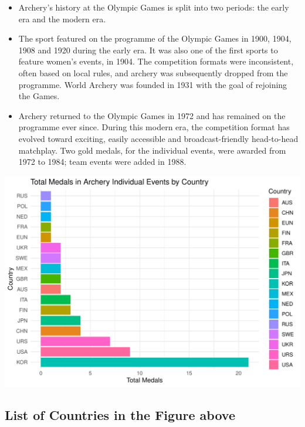 \documentclass[12pt,preprint, authoryear]{elsarticle}
\let\origfigure\figure
\let\endorigfigure\endfigure
\renewenvironment{figure}[1][2] {
    \expandafter\origfigure\expandafter[H]
} {
    \endorigfigure
}
\numberwithin{equation}{section}
\numberwithin{figure}{section}
\numberwithin{table}{section}
\begin{document}
\begin{itemize}
\item
  Archery's history at the Olympic Games is split into two periods: the
  early era and the modern era.
\item
  The sport featured on the programme of the Olympic Games in 1900,
  1904, 1908 and 1920 during the early era. It was also one of the first
  sports to feature women's events, in 1904. The competition formats
  were inconsistent, often based on local rules, and archery was
  subsequently dropped from the programme. World Archery was founded in
  1931 with the goal of rejoining the Games.
\item
  Archery returned to the Olympic Games in 1972 and has remained on the
  programme ever since. During this modern era, the competition format
  has evolved toward exciting, easily accessible and broadcast-friendly
  head-to-head matchplay. Two gold medals, for the individual events,
  were awarded from 1972 to 1984; team events were added in 1988.
\end{itemize}

\begin{figure}

{\centering \includegraphics{README_files/figure-latex/unnamed-chunk-4-1} 

}

\caption{The Top Individual Events by Country in Winning Medals in Archery\label{Figure4}}\label{fig:unnamed-chunk-4}
\end{figure}

\hypertarget{list-of-countries-in-the-figure-above}{%
\subsection{List of Countries in the Figure
above}\label{list-of-countries-in-the-figure-above}}
\end{document}
